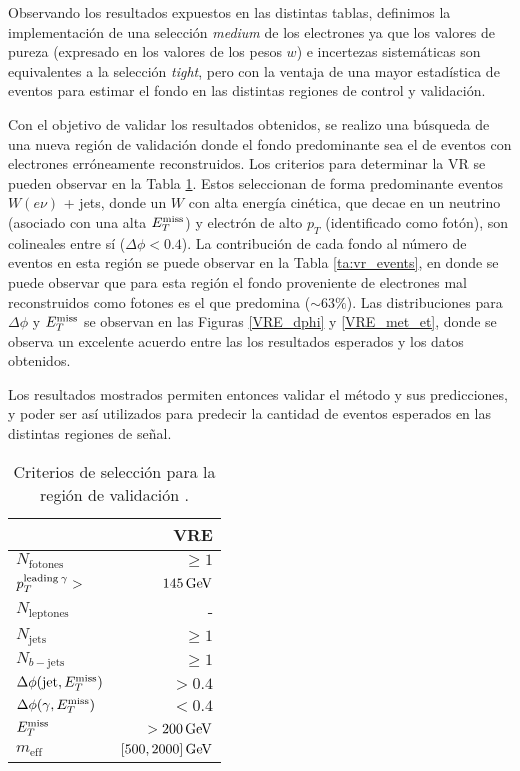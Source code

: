 Observando los resultados expuestos en las distintas tablas, definimos la implementación de una selección \textit{medium} de los electrones ya que los valores de pureza (expresado en los valores de los pesos $w$) e incertezas sistemáticas son equivalentes a la selección \textit{tight}, pero con la ventaja de una mayor estadística de eventos para estimar el fondo en las distintas regiones de control y validación.


Con el objetivo de validar los resultados obtenidos, se realizo una búsqueda de una nueva región de validación donde el fondo predominante sea el de eventos con electrones erróneamente reconstruidos. Los criterios para determinar la VR se pueden observar en la Tabla \ref{ta:vr_crit}. Estos seleccionan de forma predominante eventos $W(e\nu)$ + jets, donde un $W$ con alta energía cinética, que decae en un neutrino (asociado con una alta $E_{T}^{\text{miss}}$) y electrón de alto $p_{T}$ (identificado como fotón), son colineales entre sí ($\Delta\phi<0.4$). La contribución de cada fondo al número de eventos en esta región se puede observar en la Tabla \ref{ta:vr_events}, en donde se puede observar que para esta región el fondo proveniente de electrones mal reconstruidos como fotones es el que predomina ($\sim63\%$). Las distribuciones para $\Delta \phi$ y $E_{T}^{\text{miss}}$ se observan en las Figuras \ref{VRE_dphi} y \ref{VRE_met_et}, donde se observa un excelente acuerdo entre las los resultados esperados y los datos obtenidos.

Los resultados mostrados permiten entonces validar el método y sus predicciones, y poder ser así utilizados para predecir la cantidad de eventos esperados en las distintas regiones de señal.

\begin{table}
\centering
\caption{Criterios de selección para la región de validación \cite{drfran}.}
  \begin{tabular}{l|r}
  \hline
  \hline
  & VRE \\
  \hline
  $N_{\mathrm{fotones}}$                  &       $\ge1$  \\
  $p_{ T}^{\text{leading}\: \gamma} >$         &    $145\, \mathrm{GeV}$  \\
  $N_{\mathrm{leptones}}$                  &           -   \\
  $N_{\mathrm{jets}}$                     &       $\ge1$  \\
  $N_{b-\mathrm{jets}}$                   &       $\ge1$  \\
  $\Delta\phi(\text{jet}, E_{T}^{\text{miss}})$          &       $>0.4$  \\
  $\Delta\phi(\gamma, E_{T}^{\text{miss}})$                &       $<0.4$  \\
  ${E_{T}^{\text{miss}}}$                                &   $>200\, \mathrm{GeV}$  \\
  $m_{\text{eff}}$                               &  $[500, 2000]\, \mathrm{GeV}$  \\
  \hline
  \hline
\end{tabular}
\label{ta:vr_crit}
\end{table}

